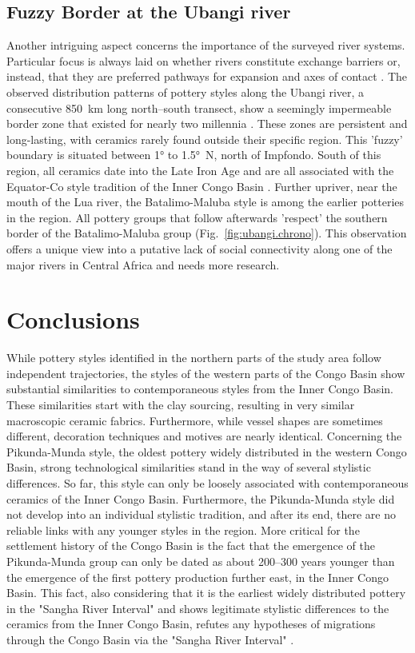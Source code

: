 \documentclass[smallextended,natbib]{svjour3}       %
\begin{document}
\subsection*{Fuzzy Border at the Ubangi river}

Another intriguing aspect concerns the importance of the surveyed river systems. Particular focus is always laid on whether rivers constitute exchange barriers or, instead, that they are preferred pathways for expansion and axes of contact \citep{Russell.2014}. The observed distribution patterns of pottery styles along the Ubangi river, a consecutive 850~km long north--south transect, show a seemingly impermeable border zone that existed for nearly two millennia \citep[Fig.~\ref{fig:ubangi.chrono};][183--185, 184 Tab.~17]{Seidensticker.2021e}. These zones are persistent and long-lasting, with ceramics rarely found outside their specific region. This 'fuzzy' boundary is situated between 1° to 1.5°~N, north of Impfondo. South of this region, all ceramics date into the Late Iron Age and are all associated with the Equator-Co style tradition of the Inner Congo Basin \citep{Wotzka.1995}. Further upriver, near the mouth of the Lua river, the Batalimo-Maluba style is among the earlier potteries in the region. All pottery groups that follow afterwards 'respect' the southern border of the Batalimo-Maluba group (Fig.~\ref{fig:ubangi.chrono}). This observation offers a unique view into a putative lack of social connectivity along one of the major rivers in Central Africa and needs more research.

\section*{Conclusions}

While pottery styles identified in the northern parts of the study area follow independent trajectories, the styles of the western parts of the Congo Basin show substantial similarities to contemporaneous styles from the Inner Congo Basin. These similarities start with the clay sourcing, resulting in very similar macroscopic ceramic fabrics. Furthermore, while vessel shapes are sometimes different, decoration techniques and motives are nearly identical. Concerning the Pikunda-Munda style, the oldest pottery widely distributed in the western Congo Basin, strong technological similarities stand in the way of several stylistic differences. So far, this style can only be loosely associated with contemporaneous ceramics of the Inner Congo Basin. Furthermore, the Pikunda-Munda style did not develop into an individual stylistic tradition, and after its end, there are no reliable links with any younger styles in the region. More critical for the settlement history of the Congo Basin is the fact that the emergence of the Pikunda-Munda group can only be dated as about 200--300 years younger than the emergence of the first pottery production further east, in the Inner Congo Basin. This fact, also considering that it is the earliest widely distributed pottery in the "Sangha River Interval" and shows legitimate stylistic differences to the ceramics from the Inner Congo Basin, refutes any hypotheses of migrations through the Congo Basin via the "Sangha River Interval" \citep{Bostoen.2015,Grollemund.2015,Grollemund.2023}.
\end{document}
